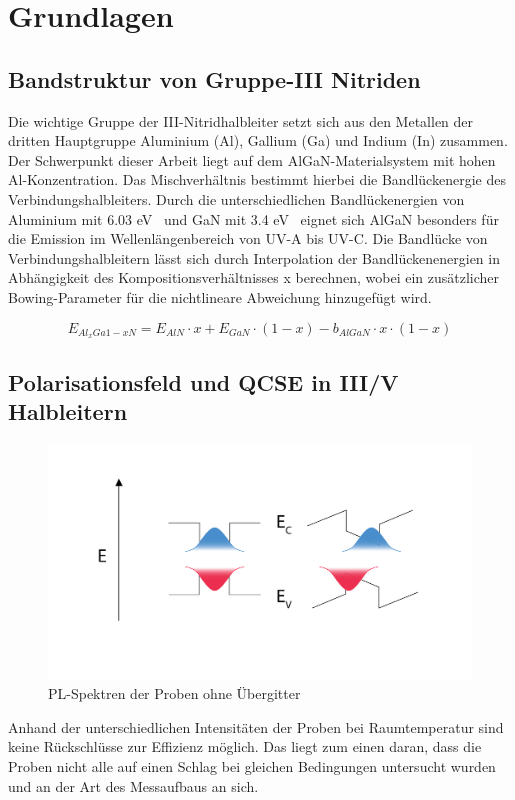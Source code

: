 
\chapter{Grundlagen}
\thispagestyle{fancy}

\section{Bandstruktur von Gruppe-III Nitriden}

Die wichtige Gruppe der III-Nitridhalbleiter setzt sich aus den Metallen
der dritten Hauptgruppe Aluminium (Al), Gallium (Ga) und Indium (In) zusammen.
Der Schwerpunkt dieser Arbeit liegt auf dem AlGaN-Materialsystem mit hohen Al-Konzentration.
Das Mischverhältnis bestimmt hierbei die Bandlückenergie des Verbindungshalbleiters. Durch die unterschiedlichen Bandlückenergien von Aluminium mit 6.03 eV~\cite{fenaln} und GaN mit 3.4 eV~\cite{pipr} eignet sich AlGaN besonders für die Emission im Wellenlängenbereich von UV-A bis UV-C. 
Die Bandlücke von Verbindungshalbleitern lässt sich durch Interpolation der Bandlückenenergien in Abhängigkeit des Kompositionsverhältnisses x berechnen,
wobei ein zusätzlicher Bowing-Parameter für die nichtlineare Abweichung hinzugefügt wird. 

\begin{equation}
    E_{Al_{x}Ga{1-x}N} = E_{AlN} \cdot x + E_{GaN} \cdot (1-x) - b_{AlGaN} \cdot x \cdot (1-x) 
\end{equation}


\newpage
\section{Polarisationsfeld und QCSE in III/V Halbleitern}
\begin{figure}[htb]
    \centering
    \begin{minipage}[t]{0.49\linewidth}
        \centering
        \includegraphics[width=\linewidth]{Bilder/QCSE.pdf}
        \caption{PL-Spektren der Proben ohne Übergitter}
    \end{minipage}%
\end{figure}
\vspace{1cm}
\raggedright
Anhand der unterschiedlichen Intensitäten der Proben bei Raumtemperatur sind keine Rückschlüsse zur Effizienz möglich. 
Das liegt zum einen daran, dass die Proben nicht alle auf einen Schlag bei gleichen Bedingungen untersucht wurden und an der Art des Messaufbaus an sich. 
